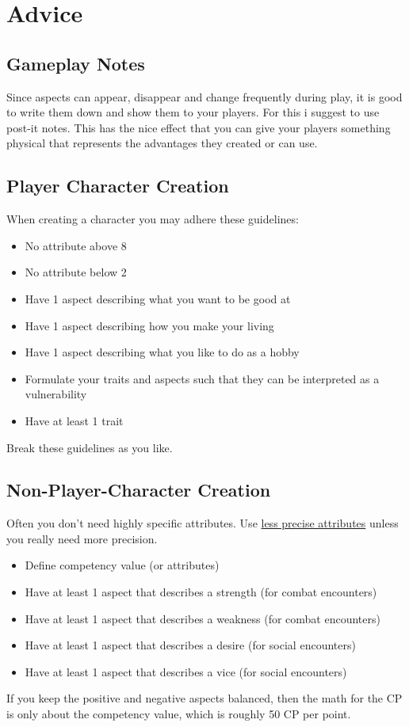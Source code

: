 \documentclass[11pt]{article}
\begin{document}
{\newpage
\section{Advice}
\label{sec:org3182827}
\subsection{Gameplay Notes}
\label{sec:org496751d}

Since aspects can appear, disappear and change frequently during play, it is good to write them down and show them to your players. For this i suggest to use post-it notes. This has the nice effect that you can give your players something physical that represents the advantages they created or can use.
\subsection{Player Character Creation}
\label{sec:org45aeb40}

When creating a character you may adhere these guidelines:
\begin{itemize}
\item No attribute above 8
\item No attribute below 2
\item Have 1 aspect describing what you want to be good at
\item Have 1 aspect describing how you make your living
\item Have 1 aspect describing what you like to do as a hobby
\item Formulate your traits and aspects such that they can be interpreted as a vulnerability
\item Have at least 1 trait
\end{itemize}
Break these guidelines as you like.
\subsection{Non-Player-Character Creation}
\label{sec:org42e81fb}

Often you don't need highly specific attributes. Use \hyperref[sec:org454850e]{less precise attributes} unless you really need more precision.
\begin{itemize}
\item Define competency value (or attributes)
\item Have at least 1 aspect that describes a strength (for combat encounters)
\item Have at least 1 aspect that describes a weakness (for combat encounters)
\item Have at least 1 aspect that describes a desire (for social encounters)
\item Have at least 1 aspect that describes a vice (for social encounters)
\end{itemize}
If you keep the positive and negative aspects balanced, then the math for the CP is only about the competency value, which is roughly 50 CP per point.
}
\end{document}
